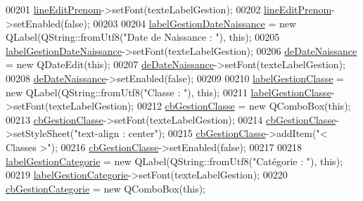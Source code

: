 \begin{DoxyCode}
00201     \hyperlink{class_i_h_m_gestion_cross_a7bea7529f01cf8ca8f365d418aae52d5}{lineEditPrenom}->setFont(texteLabelGestion);
00202     \hyperlink{class_i_h_m_gestion_cross_a7bea7529f01cf8ca8f365d418aae52d5}{lineEditPrenom}->setEnabled(\textcolor{keyword}{false});
00203 
00204     \hyperlink{class_i_h_m_gestion_cross_af15625b1b1bfb04468f0ed7c6ba39b1b}{labelGestionDateNaissance} = \textcolor{keyword}{new} QLabel(QString::fromUtf8(\textcolor{stringliteral}{"Date de Naissance : 
      "}), \textcolor{keyword}{this});
00205     \hyperlink{class_i_h_m_gestion_cross_af15625b1b1bfb04468f0ed7c6ba39b1b}{labelGestionDateNaissance}->setFont(texteLabelGestion);
00206     \hyperlink{class_i_h_m_gestion_cross_a1c63c5c91be88aef13d2582e48dff7d0}{deDateNaissance} = \textcolor{keyword}{new} QDateEdit(\textcolor{keyword}{this});
00207     \hyperlink{class_i_h_m_gestion_cross_a1c63c5c91be88aef13d2582e48dff7d0}{deDateNaissance}->setFont(texteLabelGestion);
00208     \hyperlink{class_i_h_m_gestion_cross_a1c63c5c91be88aef13d2582e48dff7d0}{deDateNaissance}->setEnabled(\textcolor{keyword}{false});
00209 
00210     \hyperlink{class_i_h_m_gestion_cross_a4f070ed70d6d076d07c96562e366c805}{labelGestionClasse} = \textcolor{keyword}{new} QLabel(QString::fromUtf8(\textcolor{stringliteral}{"Classe : "}), \textcolor{keyword}{this});
00211     \hyperlink{class_i_h_m_gestion_cross_a4f070ed70d6d076d07c96562e366c805}{labelGestionClasse}->setFont(texteLabelGestion);
00212     \hyperlink{class_i_h_m_gestion_cross_af734c4b13942dd83fbbd0355e3728c9f}{cbGestionClasse} = \textcolor{keyword}{new} QComboBox(\textcolor{keyword}{this});
00213     \hyperlink{class_i_h_m_gestion_cross_af734c4b13942dd83fbbd0355e3728c9f}{cbGestionClasse}->setFont(texteLabelGestion);
00214     \hyperlink{class_i_h_m_gestion_cross_af734c4b13942dd83fbbd0355e3728c9f}{cbGestionClasse}->setStyleSheet(\textcolor{stringliteral}{"text-align : center"});
00215     \hyperlink{class_i_h_m_gestion_cross_af734c4b13942dd83fbbd0355e3728c9f}{cbGestionClasse}->addItem(\textcolor{stringliteral}{"< Classes >"});
00216     \hyperlink{class_i_h_m_gestion_cross_af734c4b13942dd83fbbd0355e3728c9f}{cbGestionClasse}->setEnabled(\textcolor{keyword}{false});
00217 
00218     \hyperlink{class_i_h_m_gestion_cross_a04af17f1ebbbbac6d9c4509c94bc6f39}{labelGestionCategorie} = \textcolor{keyword}{new} QLabel(QString::fromUtf8(\textcolor{stringliteral}{"Catégorie : "}), \textcolor{keyword}{this});
00219     \hyperlink{class_i_h_m_gestion_cross_a04af17f1ebbbbac6d9c4509c94bc6f39}{labelGestionCategorie}->setFont(texteLabelGestion);
00220     \hyperlink{class_i_h_m_gestion_cross_a60cdc44c61bcd4e1e189c8de5556b89e}{cbGestionCategorie} = \textcolor{keyword}{new} QComboBox(\textcolor{keyword}{this});

\end{DoxyCode}
